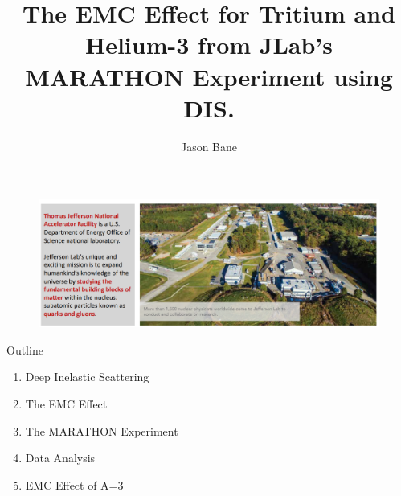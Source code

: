 \documentclass[12pt,usenames,dvipsnames]{beamer}
\title[EMC A=3]{The EMC Effect for Tritium and Helium-3 from JLab's MARATHON Experiment using DIS.} %
\author{Jason Bane} %
\institute[UTK] %
{
University of Tennessee \\ %
\medskip
\textit{jbane1@vols.utk.edu} %
}
\date{} %
\begin{document}
\begin{frame}
	\titlepage %
\end{frame}

\begin{frame}
\begin{figure}
	\includegraphics[width=12cm]{../images/Jlab1.png}
\end{figure}
\end{frame}
\begin{frame}{Outline}
\large{
\begin{enumerate}
	\item Deep Inelastic Scattering
	\item The EMC Effect
	\item The MARATHON Experiment
	\item Data Analysis
	\item EMC Effect of A=3
\end{enumerate} 
}

\end{frame}
\end{document}
